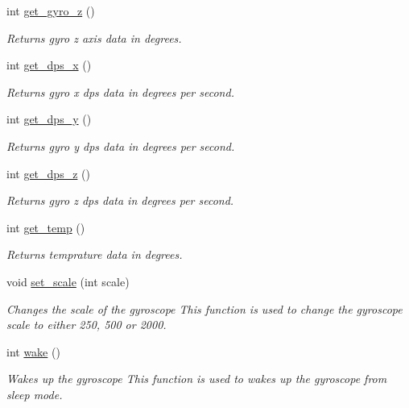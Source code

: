 \begin{DoxyCompactItemize}
int \hyperlink{classsogyro_a71e8f90b8fcb6a3351600a1dda5c8923}{get\+\_\+gyro\+\_\+z} ()
\begin{DoxyCompactList}\small\item\em Returns gyro z axis data in degrees. \end{DoxyCompactList}\item 
int \hyperlink{classsogyro_acad639f73b31704bd60dcb81ca4d8ed1}{get\+\_\+dps\+\_\+x} ()
\begin{DoxyCompactList}\small\item\em Returns gyro x dps data in degrees per second. \end{DoxyCompactList}\item 
int \hyperlink{classsogyro_add0d7fc633b0410127e243f2eba19f2d}{get\+\_\+dps\+\_\+y} ()
\begin{DoxyCompactList}\small\item\em Returns gyro y dps data in degrees per second. \end{DoxyCompactList}\item 
int \hyperlink{classsogyro_acaaac40f021d89a77c093b2303e6e79c}{get\+\_\+dps\+\_\+z} ()
\begin{DoxyCompactList}\small\item\em Returns gyro z dps data in degrees per second. \end{DoxyCompactList}\item 
int \hyperlink{classsogyro_a762e79e3874507ba58910d90a115ea70}{get\+\_\+temp} ()
\begin{DoxyCompactList}\small\item\em Returns temprature data in degrees. \end{DoxyCompactList}\item 
\mbox{\label{classsogyro_ac253f3fa45e48f2f31a6211bb5c60894}} 
void \hyperlink{classsogyro_ac253f3fa45e48f2f31a6211bb5c60894}{set\+\_\+scale} (int scale)
\begin{DoxyCompactList}\small\item\em Changes the scale of the gyroscope  This function is used to change the gyroscope scale to either 250, 500 or 2000. \end{DoxyCompactList}\item 
\mbox{\label{classsogyro_a8a0a938e79e5ab36803c4922fe88bbcb}} 
int \hyperlink{classsogyro_a8a0a938e79e5ab36803c4922fe88bbcb}{wake} ()
\begin{DoxyCompactList}\small\item\em Wakes up the gyroscope  This function is used to wakes up the gyroscope from sleep mode. \end{DoxyCompactList}\item 

\end{DoxyCompactItemize}
